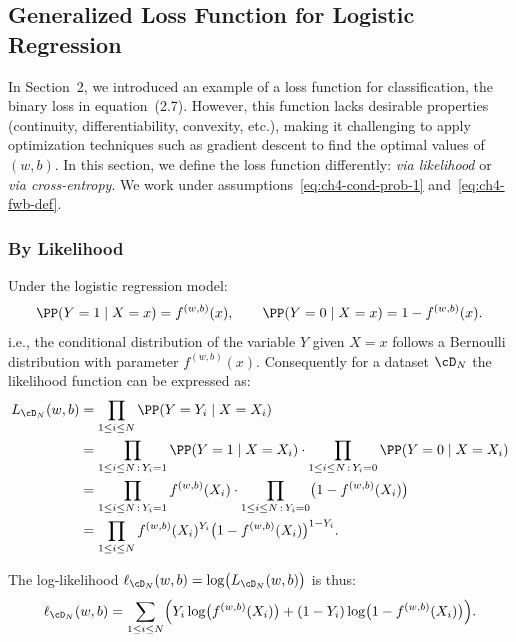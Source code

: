 \subsection{Generalized Loss Function for Logistic Regression}

In Section~2, we introduced an example of a loss function for classification, the
binary loss in equation~(2.7). However, this function lacks desirable properties
(continuity, differentiability, convexity, etc.), making it challenging to apply
optimization techniques such as gradient descent to find the optimal values of
$(w, b)$. In this section, we define the loss function differently: \emph{via likelihood} or
\emph{via cross-entropy}. We work under assumptions~\eqref{eq:ch4-cond-prob-1} and~\eqref{eq:ch4-fwb-def}.

\subsubsection*{By Likelihood}

Under the logistic regression model:
\begin{equation}\label{eq:ch4-bern-params}
\PP(Y = 1 \mid X = x) = f^{(w,b)}(x), \qquad \PP(Y = 0 \mid X = x) = 1 - f^{(w,b)}(x).
\end{equation}
i.e., the conditional distribution of the variable $Y$ given $X = x$ follows a
Bernoulli distribution with parameter $f^{(w,b)}(x)$. Consequently for a dataset
$\cD_N$ the likelihood function can be expressed as:
\begin{align}
L_{\cD_N}(w, b) &= \prod_{1 \le i \le N} \PP(Y = Y_i \mid X = X_i) \nonumber\\
&= \prod_{1 \le i \le N\,:\, Y_i = 1} \PP(Y = 1 \mid X = X_i) \cdot \prod_{1 \le i \le N\,:\, Y_i = 0} \PP(Y = 0 \mid X = X_i) \label{eq:ch4-lik-split}\\
&= \prod_{1 \le i \le N\,:\, Y_i = 1} f^{(w,b)}(X_i) \cdot \prod_{1 \le i \le N\,:\, Y_i = 0} \bigl(1 - f^{(w,b)}(X_i)\bigr) \nonumber\\
&= \prod_{1 \le i \le N} f^{(w,b)}(X_i)^{Y_i} \bigl(1 - f^{(w,b)}(X_i)\bigr)^{1 - Y_i}. \label{eq:ch4-lik-bern}
\end{align}

The log-likelihood $\ell_{\cD_N}(w, b) = \log\bigl(L_{\cD_N}(w, b)\bigr)$ is thus:
\begin{equation}\label{eq:ch4-loglik-logistic}
\ell_{\cD_N}(w, b) = \sum_{1 \le i \le N} \Bigl( Y_i \log\bigl( f^{(w,b)}(X_i) \bigr) + (1 - Y_i) \log\bigl( 1 - f^{(w,b)}(X_i) \bigr) \Bigr).
\end{equation}

